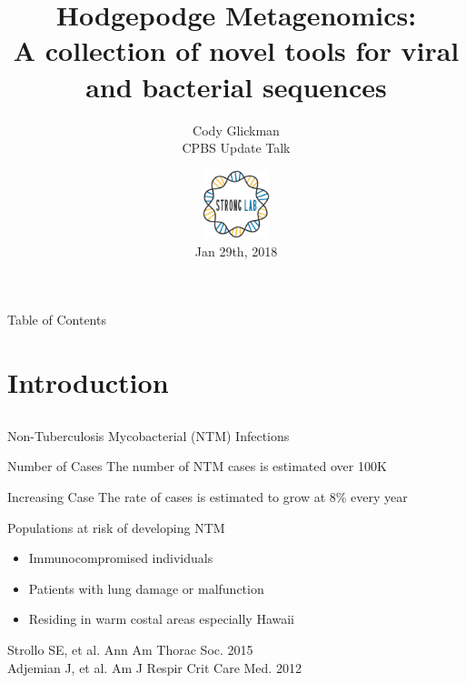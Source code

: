\documentclass[11pt]{beamer}
\author{Cody Glickman \\ CPBS Update Talk}
\title{Hodgepodge Metagenomics: \\ A collection of novel tools for viral and bacterial sequences}
\date{ \includegraphics[height=2cm, width=2cm]{lablogo.png} \\ Jan 29th, 2018}
\begin{document}
	\maketitle
	\begin{frame}{Table of Contents}
		\tableofcontents
	\end{frame}
	
	
\section{Introduction}
\subsection{}

	\begin{frame}{Non-Tuberculosis Mycobacterial (NTM) Infections}
	
		\begin{block}{Number of Cases}
		The number of NTM cases is estimated over 100K
		\end{block}
		
		\begin{block}{Increasing Case}
		The rate of cases is estimated to grow at 8\% every year
		\end{block}
		
		
		\begin{block}{Populations at risk of developing NTM}
		\begin{itemize}
		\item Immunocompromised individuals 
		\item Patients with lung damage or malfunction 
		\item Residing in warm costal areas especially Hawaii
		\end{itemize}
		\end{block} 
		
		\begin{block}
		
		\end{block}
		
	\tiny{Strollo SE, et al. Ann Am Thorac Soc. 2015 \\
	Adjemian J, et al. Am J Respir Crit Care Med. 2012}
	
	\end{frame}
	
\end{document}
